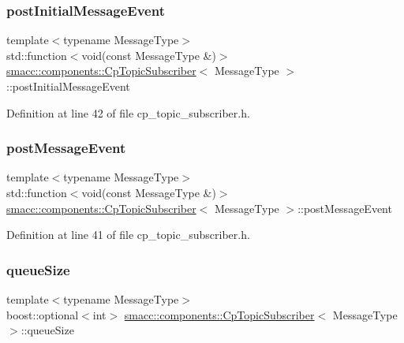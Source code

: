 \subsubsection{\texorpdfstring{post\+Initial\+Message\+Event}{postInitialMessageEvent}}
{\footnotesize\ttfamily template$<$typename Message\+Type$>$ \\
std\+::function$<$void(const Message\+Type \&)$>$ \hyperlink{classsmacc_1_1components_1_1CpTopicSubscriber}{smacc\+::components\+::\+Cp\+Topic\+Subscriber}$<$ Message\+Type $>$\+::post\+Initial\+Message\+Event}



Definition at line 42 of file cp\+\_\+topic\+\_\+subscriber.\+h.

\mbox{\label{classsmacc_1_1components_1_1CpTopicSubscriber_a002ca59f74f784f14597d1c0e057d298}} 
\subsubsection{\texorpdfstring{post\+Message\+Event}{postMessageEvent}}
{\footnotesize\ttfamily template$<$typename Message\+Type$>$ \\
std\+::function$<$void(const Message\+Type \&)$>$ \hyperlink{classsmacc_1_1components_1_1CpTopicSubscriber}{smacc\+::components\+::\+Cp\+Topic\+Subscriber}$<$ Message\+Type $>$\+::post\+Message\+Event}



Definition at line 41 of file cp\+\_\+topic\+\_\+subscriber.\+h.

\mbox{\label{classsmacc_1_1components_1_1CpTopicSubscriber_ad8775c1e5773a2c58d63ad2d64d28580}} 
\subsubsection{\texorpdfstring{queue\+Size}{queueSize}}
{\footnotesize\ttfamily template$<$typename Message\+Type$>$ \\
boost\+::optional$<$int$>$ \hyperlink{classsmacc_1_1components_1_1CpTopicSubscriber}{smacc\+::components\+::\+Cp\+Topic\+Subscriber}$<$ Message\+Type $>$\+::queue\+Size}



